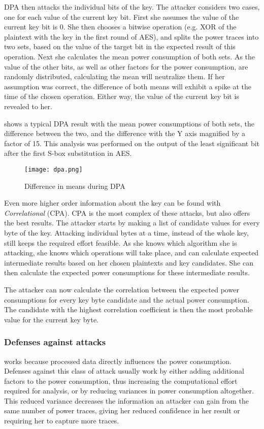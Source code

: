 DPA then attacks the individual bits of the key.
The attacker considers two cases, one for each value of the current key bit.
First she assumes the value of the current key bit is 0.
She then chooses a bitwise operation (e.g. XOR of the plaintext with the key in the first round of AES), and splits the power traces into two sets, based on the value of the target bit in the expected result of this operation.
Next she calculates the mean power consumption of both sets.
As the value of the other bits, as well as other factors for the power consumption, are randomly distributed, calculating the mean will neutralize them.
If her assumption was correct, the difference of both means will exhibit a spike at the time of the chosen operation.
Either way, the value of the current key bit is revealed to her.

 shows a typical DPA result with the mean power consumptions of both sets, the difference between the two, and the difference with the Y axis magnified by a factor of 15.
This analysis was performed on the output of the least significant bit after the first S-box substitution in AES.

\begin{figure}[h]
  \centering
  \texttt{[image: dpa.png]}
  \caption{Difference in means during DPA\cite{kocher2011introduction}}
  \label{fig:dpa}
\end{figure}

Even more higher order information about the key can be found with \emph{Correlational \poweranalysis{}} (CPA).
CPA is the most complex of these attacks, but also offers the best results.
The attacker starts by making a list of candidate values for every byte of the key.
Attacking individual bytes at a time, instead of the whole key, still keeps the required effort feasible.
As she knows which algorithm she is attacking, she knows which operations will take place, and can calculate expected intermediate results based on her chosen plaintexts and key candidates.
She can then calculate the expected power consumptions for these intermediate results.

The attacker can now calculate the correlation between the expected power consumptions for every key byte candidate and the actual power consumption.
The candidate with the highest correlation coefficient is then the most probable value for the current key byte.

\subsubsection{Defenses against \poweranalysis{} attacks}
\poweranalysis{} works because processed data directly influences the power consumption.
Defenses against this class of attack usually work by either adding additional factors to the power consumption, thus increasing the computational effort required for analysis, or by reducing variances in power consumption altogether.
This reduced variance decreases the information an attacker can gain from the same number of power traces, giving her reduced confidence in her result or requiring her to capture more traces.

